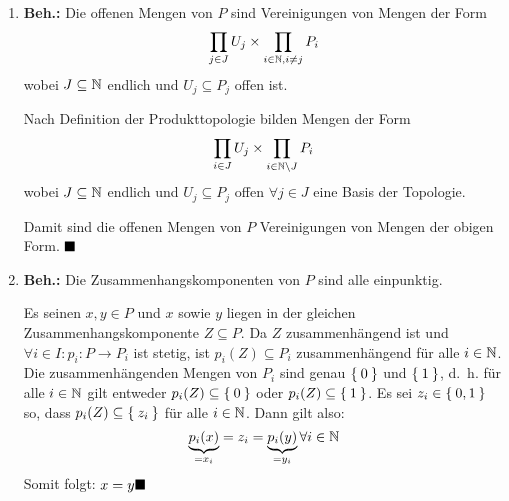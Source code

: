 \begin{solution}[\ref{ub2:aufg4}]
    \begin{enumerate}[label=(\alph*)]
        \item \textbf{Beh.:} Die offenen Mengen von $P$ sind
              Vereinigungen von Mengen der Form
              \[\prod_{j \in J} U_j \times \prod_{i \in \mathbb{N}, i \neq j} P_i\]
              wobei $J \subseteq \mathbb{N}$ endlich und $U_j \subseteq P_j$
              offen ist.
              \begin{beweis}
                Nach Definition der Produkttopologie bilden Mengen
                der Form
                \[\prod_{i \in J} U_j \times \prod_{i \in \mathbb{N} \setminus J} P_i\]
                wobei $J \subseteq \mathbb{N}$ endlich und $U_j \subseteq P_j$ offen
                $\forall{j \in J}$
                eine Basis der Topologie.

                Damit sind die offenen
                Mengen von $P$ Vereinigungen von Mengen der obigen
                Form. $\qed$
              \end{beweis}
        \item \textbf{Beh.:} Die Zusammenhangskomponenten von $P$
              sind alle einpunktig.
              \begin{beweis}
                Es seinen $x,y \in P$ und $x$ sowie $y$ liegen in der
                gleichen Zusammenhangskomponente $Z \subseteq P$.
                Da $Z$ zusammenhängend ist und $\forall{i \in I}: p_i : P \rightarrow P_i$
                ist stetig, ist $p_i(Z) \subseteq P_i$ zusammenhängend
                für alle $i \in \mathbb{N}$. Die zusammenhängenden Mengen
                von $P_i$ sind genau $\Set{0}$ und $\Set{1}$, d.~h.
                für alle $i \in \mathbb{N}$ gilt entweder $p_i(Z) \subseteq \Set{0}$
                oder $p_i(Z) \subseteq \Set{1}$. Es sei $z_i \in \Set{0,1}$
                so, dass $p_i(Z) \subseteq \Set{z_i}$ für alle $i \in \mathbb{N}$.
                Dann gilt also:
                \[\underbrace{p_i(x)}_{= x_i} = z_i = \underbrace{p_i(y)}_{= y_i} \forall i \in \mathbb{N}\]
                Somit folgt: $x = y \qed$

              \end{beweis}
    \end{enumerate}
\end{solution}

